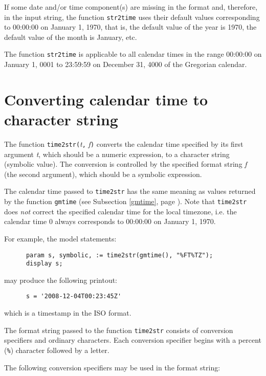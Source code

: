 \documentclass[11pt]{report}
\begin{document}
\newpage

If some date and/or time component(s) are missing in the format and,
therefore, in the input string, the function {\tt str2time} uses their
default values corresponding to 00:00:00 on January 1, 1970, that is,
the default value of the year is 1970, the default value of the month
is January, etc.

The function {\tt str2time} is applicable to all calendar times in the
range 00:00:00 on January 1, 0001 to 23:59:59 on December 31, 4000 of
the Gregorian calendar.

\section{Converting calendar time to character string}
\label{time2str}

The function {\tt time2str(}{\it t}{\tt,} {\it f}{\tt)} converts the
calendar time specified by its first argument {\it t}, which should be
a numeric expression, to a character string (symbolic value). The
conversion is controlled by the specified format string {\it f} (the
second argument), which should be a symbolic expression.

The calendar time passed to {\tt time2str} has the same meaning as
values returned by the function {\tt gmtime} (see Subsection
\ref{gmtime}, page \pageref{gmtime}). Note that {\tt time2str} does
{\it not} correct the specified calendar time for the local timezone,
i.e. the calendar time 0 always corresponds to 00:00:00 on January 1,
1970.

For example, the model statements:

\begin{verbatim}
      param s, symbolic, := time2str(gmtime(), "%FT%TZ");
      display s;
\end{verbatim}

\noindent may produce the following printout:

\begin{verbatim}
      s = '2008-12-04T00:23:45Z'
\end{verbatim}

\noindent which is a timestamp in the ISO format.

The format string passed to the function {\tt time2str} consists of
conversion specifiers and ordinary characters. Each conversion
specifier begins with a percent ({\tt\%}) character followed by a
letter.

The following conversion specifiers may be used in the format string:
\end{document}
